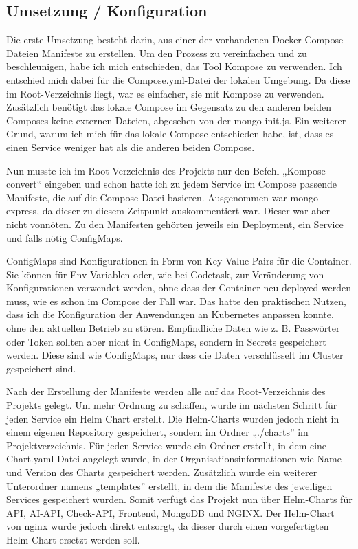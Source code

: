\subsection{Umsetzung / Konfiguration}

Die erste Umsetzung besteht darin, aus einer der vorhandenen Docker-Compose-Dateien Manifeste zu erstellen.
Um den Prozess zu vereinfachen und zu beschleunigen, habe ich mich entschieden, das Tool Kompose zu verwenden.
Ich entschied mich dabei für die Compose.yml-Datei der lokalen Umgebung. 
Da diese im Root-Verzeichnis liegt, war es einfacher, sie mit Kompose zu verwenden. Zusätzlich benötigt das lokale Compose im Gegensatz zu den anderen beiden Composes keine externen Dateien, abgesehen von der mongo-init.js.
Ein weiterer Grund, warum ich mich für das lokale Compose entschieden habe, ist, dass es einen Service weniger hat als die anderen beiden Compose.

Nun musste ich im Root-Verzeichnis des Projekts nur den Befehl „Kompose convert“ eingeben und schon hatte ich zu jedem Service im Compose passende Manifeste, die auf die Compose-Datei basieren. Ausgenommen war mongo-express, da dieser zu diesem Zeitpunkt auskommentiert war. Dieser war aber nicht vonnöten.
Zu den Manifesten gehörten jeweils ein Deployment, ein Service und falls nötig ConfigMaps.

ConfigMaps sind Konfigurationen in Form von Key-Value-Pairs für die Container. Sie können für Env-Variablen oder, wie bei Codetask, zur Veränderung von Konfigurationen verwendet werden, ohne dass der Container neu deployed werden muss, wie es schon im Compose der Fall war.
Das hatte den praktischen Nutzen, dass ich die Konfiguration der Anwendungen an Kubernetes anpassen konnte, ohne den aktuellen Betrieb zu stören.
Empfindliche Daten wie z. B. Passwörter oder Token sollten aber nicht in ConfigMaps, sondern in Secrets gespeichert werden. Diese sind wie ConfigMaps, nur dass die Daten verschlüsselt im Cluster gespeichert sind.

Nach der Erstellung der Manifeste werden alle auf das Root-Verzeichnis des Projekts gelegt. Um mehr Ordnung zu schaffen, wurde im nächsten Schritt für jeden Service ein Helm Chart erstellt.
Die Helm-Charts wurden jedoch nicht in einem eigenen Repository gespeichert, sondern im Ordner „./charts” im Projektverzeichnis. Für jeden Service wurde ein Ordner erstellt, in dem eine Chart.yaml-Datei angelegt wurde, in der Organisationsinformationen wie Name und Version des Charts gespeichert werden. Zusätzlich wurde ein weiterer Unterordner namens „templates” erstellt, in dem die Manifeste des jeweiligen Services gespeichert wurden.
Somit verfügt das Projekt nun über Helm-Charts für API, AI-API, Check-API, Frontend, MongoDB und NGINX. Der Helm-Chart von nginx wurde jedoch direkt entsorgt, da dieser durch einen vorgefertigten Helm-Chart ersetzt werden soll.


